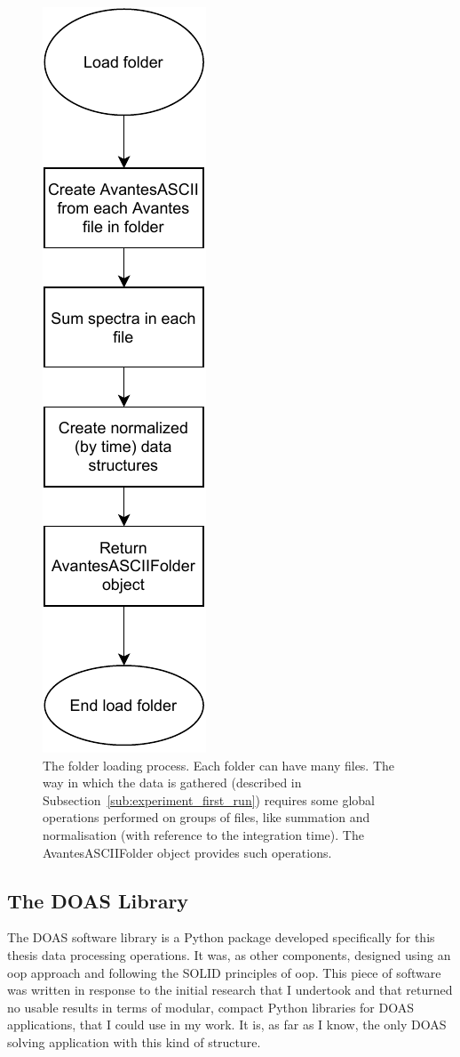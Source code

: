 \begin{figure}[htpb]
\begin{minipage}{.45\textwidth}
        \includegraphics[width=0.3\linewidth]{img/pdf/folder_loading.pdf}
        \caption{The folder loading process. Each folder can have many
        files. The way in which the data is gathered (described in
        Subsection~\ref{sub:experiment_first_run}) requires some global
        operations performed on groups of files, like summation and
        normalisation (with reference to the integration time). The
        AvantesASCIIFolder object provides such operations.}
        \label{fig:avantesASCIIFolder}
    \end{minipage}
\end{figure}

\subsection{The DOAS Library}%
\label{sub:the_doas_library}

The \gls{DOAS} software library is a Python package developed
specifically for this thesis data processing operations. It was, as
other components, designed using an \gls{oop} approach and following the
SOLID principles of \acrlong{oop}. This piece of software was written in
response to the initial research that I undertook and that returned no
usable results in terms of modular, compact Python libraries for
\gls{DOAS} applications, that I could use in my work. It is, as far as I
know,  the only \gls{DOAS} solving application with this kind of
structure.

